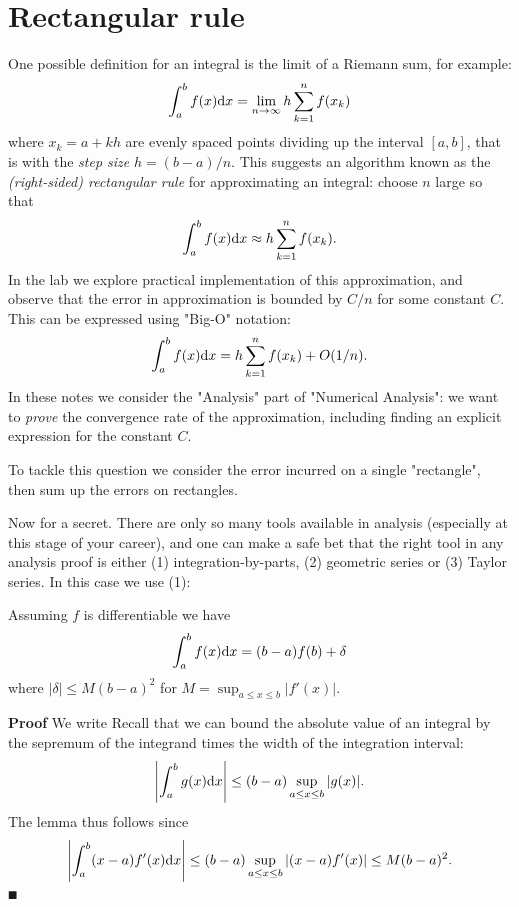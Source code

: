 
\section{Rectangular rule}
One possible definition for an integral is the limit of a Riemann sum, for example:
\[
  \ensuremath{\int}_a^b f(x) {\rm d}x = \lim_{n \ensuremath{\rightarrow} \ensuremath{\infty}} h \ensuremath{\sum}_{k=1}^n f(x_k)
\]
where $x_k = a+kh$ are evenly spaced points dividing up the interval $[a,b]$, that is  with the \emph{step size} $h = (b-a)/n$. This suggests an algorithm known as the \emph{(right-sided) rectangular rule} for approximating an integral: choose $n$ large so that
\[
  \ensuremath{\int}_a^b f(x) {\rm d}x \ensuremath{\approx} h \ensuremath{\sum}_{k=1}^n f(x_k).
\]
In the lab we explore practical implementation of this approximation, and observe that the error in approximation is bounded by $C/n$ for some constant $C$. This can be expressed using "Big-O" notation:
\[
\ensuremath{\int}_a^b f(x) {\rm d}x = h \ensuremath{\sum}_{k=1}^n f(x_k) + O(1/n).
\]
In these notes we consider the "Analysis" part of "Numerical Analysis": we want to \emph{prove} the convergence rate of the approximation, including finding an explicit expression for the constant $C$.

To tackle this question we consider the error incurred on a single "rectangle", then sum up the errors on rectangles.

Now for a secret. There are only so many tools available in analysis (especially at this stage of your career), and one can make a safe bet that the right tool in any analysis proof is either (1) integration-by-parts, (2) geometric series or (3) Taylor series. In this case we use (1):

\begin{lemma} Assuming $f$ is differentiable we have
\[
\ensuremath{\int}_a^b f(x) {\rm d}x = (b-a) f(b) + \ensuremath{\delta}
\]
where $|\ensuremath{\delta}| \ensuremath{\leq} M (b-a)^2$ for $M = \sup_{a \ensuremath{\leq} x \ensuremath{\leq} b}|f'(x)|$.

\end{lemma}
\textbf{Proof} We write
Recall that we can bound the absolute value of an integral by the sepremum of the integrand times the width of the integration interval:
\[
\left|{\int_a^b g(x) {\rm d} x}\right| \leq (b-a) \sup_{a \leq x \leq b}|g(x)|.
\]
The lemma thus follows since
\[
\left|{\int_a^b (x-a) f'(x) {\rm d} x}\right| \leq (b-a) \sup_{a \leq x \leq b}|(x-a) f'(x)| \leq M (b-a)^2.
\]
\ensuremath{\QED}

